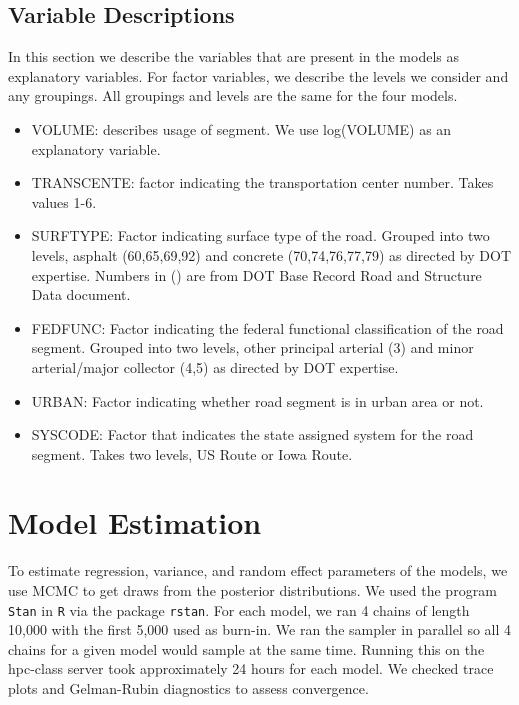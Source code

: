 \documentclass[a4paper]{article}\usepackage[]{graphicx}\usepackage[]{color}
\begin{document}
\subsection{Variable Descriptions}
In this section we describe the variables that are present in the models as explanatory variables. For factor variables, we describe the levels we consider and any groupings. All groupings and levels are the same for the four models.

\begin{itemize}
\item
VOLUME: describes usage of segment. We use log(VOLUME) as an explanatory variable.

\item
TRANSCENTE: factor indicating the transportation center number. Takes values 1-6.

\item
SURFTYPE: Factor indicating surface type of the road. Grouped into two levels, asphalt (60,65,69,92) and concrete (70,74,76,77,79) as directed by DOT expertise. Numbers in () are from DOT Base Record Road and Structure Data document.

\item
FEDFUNC: Factor indicating the federal functional classification of the road segment. Grouped into two levels, other principal arterial (3) and minor arterial/major collector (4,5) as directed by DOT expertise.

\item
URBAN: Factor indicating whether road segment is in urban area or not.

\item
SYSCODE: Factor that indicates the state assigned system for the road segment. Takes two levels, US Route or Iowa Route.

\end{itemize}

\section{Model Estimation}
To estimate regression, variance, and random effect parameters of the models, we use MCMC to get draws from the posterior distributions. We used the program \texttt{Stan} in \texttt{R} via the package \texttt{rstan}. For each model, we ran 4 chains of length 10,000 with the first 5,000 used as burn-in. We ran the sampler in parallel so all 4 chains for a given model would sample at the same time. Running this on the hpc-class server took approximately 24 hours for each model. We checked trace plots and Gelman-Rubin diagnostics to assess convergence. 
\end{document}
